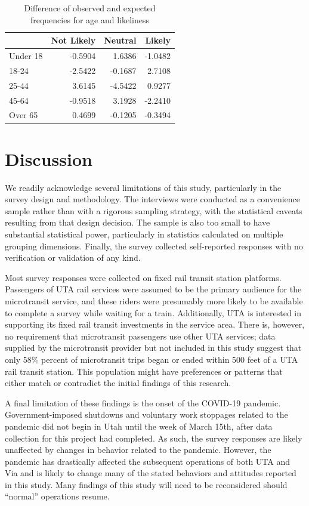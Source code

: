 \documentclass[smartcities,article,submit,moreauthors,pdftex]{mdpi}
\begin{document}
\begin{table}

\caption{\label{tab:age-difference}Difference of observed and expected frequencies for age and likeliness}
\centering
\begin{tabular}[t]{lrrr}
\toprule
  & Not Likely & Neutral & Likely\\
\midrule
Under 18 & -0.5904 & 1.6386 & -1.0482\\
18-24 & -2.5422 & -0.1687 & 2.7108\\
25-44 & 3.6145 & -4.5422 & 0.9277\\
45-64 & -0.9518 & 3.1928 & -2.2410\\
Over 65 & 0.4699 & -0.1205 & -0.3494\\
\bottomrule
\end{tabular}
\end{table}

\hypertarget{discussion}{%
\section{Discussion}\label{discussion}}

We readily acknowledge several limitations of this study, particularly in the
survey design and methodology. The interviews were conducted as a convenience
sample rather than with a rigorous sampling strategy, with the statistical
caveats resulting from that design decision. The sample is also too small to
have substantial statistical power, particularly in statistics calculated on
multiple grouping dimensions. Finally, the survey collected self-reported
responses with no verification or validation of any kind.

Most survey responses were collected on fixed rail transit station platforms.
Passengers of UTA rail services were assumed to be the primary audience for the
microtransit service, and these riders were presumably more likely to be
available to complete a survey while waiting for a train. Additionally, UTA is
interested in supporting its fixed rail transit investments in the service area.
There is, however, no requirement that microtransit passengers use other UTA
services; data supplied by the microtransit provider but not included in this
study suggest that only 58\% percent of microtransit trips began or ended within
500 feet of a UTA rail transit station. This population might have preferences
or patterns that either match or contradict the initial findings of this
research.

A final limitation of these findings is the onset of the COVID-19 pandemic.
Government-imposed shutdowns and voluntary work stoppages related to the
pandemic did not begin in Utah until the week of March 15th, after data
collection for this project had completed. As such, the survey responses are
likely unaffected by changes in behavior related to the pandemic. However, the
pandemic has drastically affected the subsequent operations of both UTA and Via
and is likely to change many of the stated behaviors and attitudes reported in
this study. Many findings of this study will need to be reconsidered should
``normal'' operations resume.
\end{document}
